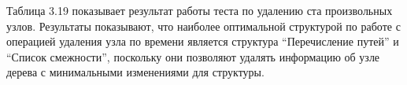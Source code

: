 \documentclass[a4paper,14pt]{extreport}
\theoremstyle{definition}
\begin{document}
\begin{enumerate}
Таблица 3.19 показывает результат работы теста по удалению ста произвольных узлов. Результаты показывают, что наиболее оптимальной структурой по работе с операцией удаления узла по времени является структура “Перечисление путей” и “Список смежности”, поскольку они позволяют удалять информацию об узле дерева с минимальными изменениями для структуры.
\begin{table}[H]
\end{table}
\end{enumerate}
\end{document}
